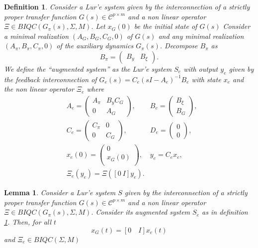 \documentclass[letterpaper,10pt,conference,twocolumn]{IEEEtran}
\newtheorem{dfn}{Definition}
\newtheorem{lem}[thm]{Lemma}
\newcommand{\csi}{\xi}
\newcommand{\Csi}{\Xi}
\begin{document}
\begin{dfn}\label{dfn:augmentedsystem}
	Consider a Lur'e system given by the interconnection of a strictly proper transfer function $G(s)\in\mathcal{C}^{p\times m}$ and a non linear operator $\Csi\in BIQC(G_{\pi}(s),\Sigma,M)$. Let $x_G(0)$ be the initial state of $G(s)$
	Consider a minimal realization $(A_G, B_G, C_G, 0)$ of $G(s)$ and any minimal realization $(A_{\pi}, B_{\pi}, C_{\pi}, 0)$ of the auxiliary dynamics $G_{\pi}(s)$.
	Decompose $B_{\pi}$ as
	\begin{equation*}
		B_{\pi}=\left( \begin{array}{cc} B_y & B_{\csi} \end{array}\right).
	\end{equation*}
	We define the ``augmented system'' as the Lur'e system $S_e$ with output $y_e$ given by the feedback interconnection of $G_e(s)=C_e(sI-A_e)^{-1}B_e$ with state $x_e$ and the non linear operator $\Xi_e$ where
	\begin{align*}
		& A_e=
		\left(\begin{array}{cc}
			A_{\pi}	& B_y C_G\\
			0	& A_G
		\end{array}\right),
		& B_e=
		\left(\begin{array}{c}
			B_{\csi}\\
			B_G
		\end{array}\right),\\
		& C_e=
		\left(\begin{array}{cc}
			C_{\pi}	& 0\\
			0	& C_G
		\end{array}\right),
		& D_e=
		\left(\begin{array}{c}
			0\\
			0
		\end{array}\right),\\
		& x_e(0)=
			\left(\begin{array}{cc}
				0\\
				x_G (0)\\
			\end{array}\right),
		& y_e=C_e x_e,\\
		& \Xi_e(y_e)=\Xi([0~I]y_e).
	\end{align*}
\end{dfn}
\begin{lem}\label{lem:implications augmented system}
	Consider a Lur'e system $S$ given by the interconnection of a strictly proper transfer function $G(s)\in\mathcal{C}^{p\times m}$ and a non linear operator $\Csi\in BIQC(G_{\pi}(s),\Sigma,M)$. Consider its augmented system $S_e$ as in definition \ref{dfn:augmentedsystem}. Then, for all $t$
	\begin{equation}\nonumber
		x_G(t)=[0\quad I] x_e(t)
	\end{equation}
	and $\Xi_e \in BIQC(\Sigma,M)$
\end{lem}
\end{document}
